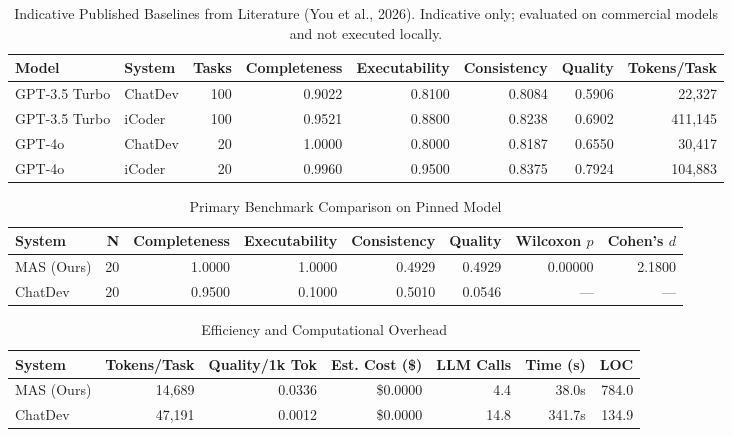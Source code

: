 \begin{table}[htbp]
\centering
\caption{Indicative Published Baselines from Literature (You et al., 2026). Indicative only; evaluated on commercial models and not executed locally.}
\label{tab:published-baselines}
\small
\begin{tabular}{llrrrrrr}
\hline
\textbf{Model} & \textbf{System} & \textbf{Tasks} & \textbf{Completeness} & \textbf{Executability} & \textbf{Consistency} & \textbf{Quality} & \textbf{Tokens/Task} \\
\hline
GPT-3.5 Turbo & ChatDev & 100 & 0.9022 & 0.8100 & 0.8084 & 0.5906 & 22,327 \\
GPT-3.5 Turbo & iCoder & 100 & 0.9521 & 0.8800 & 0.8238 & 0.6902 & 411,145 \\
GPT-4o & ChatDev & 20 & 1.0000 & 0.8000 & 0.8187 & 0.6550 & 30,417 \\
GPT-4o & iCoder & 20 & 0.9960 & 0.9500 & 0.8375 & 0.7924 & 104,883 \\
\hline
\end{tabular}
\end{table}

\begin{table}[htbp]
\centering
\caption{Primary Benchmark Comparison on Pinned Model}
\label{tab:primary-comparison}
\begin{tabular}{lrrrrrrr}
\hline
\textbf{System} & \textbf{N} & \textbf{Completeness} & \textbf{Executability} & \textbf{Consistency} & \textbf{Quality} & \textbf{Wilcoxon $p$} & \textbf{Cohen's $d$} \\
\hline
MAS (Ours) & 20 & 1.0000 & 1.0000 & 0.4929 & 0.4929 & 0.00000 & 2.1800 \\
ChatDev & 20 & 0.9500 & 0.1000 & 0.5010 & 0.0546 & --- & --- \\
\hline
\end{tabular}
\end{table}

\begin{table}[htbp]
\centering
\caption{Efficiency and Computational Overhead}
\label{tab:efficiency}
\begin{tabular}{lrrrrrr}
\hline
\textbf{System} & \textbf{Tokens/Task} & \textbf{Quality/1k Tok} & \textbf{Est. Cost (\$)} & \textbf{LLM Calls} & \textbf{Time (s)} & \textbf{LOC} \\
\hline

MAS (Ours) & 14,689 & 0.0336 & \$0.0000 & 4.4 & 38.0s & 784.0 \\
ChatDev & 47,191 & 0.0012 & \$0.0000 & 14.8 & 341.7s & 134.9 \\
\hline
\end{tabular}
\end{table}
